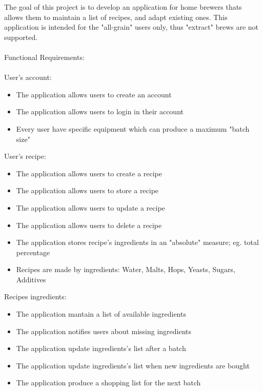 \documentclass[12pt]{article}
\begin{document}
The goal of this project is to develop an application for home brewers thats allows them to maintain a list of recipes, and adapt existing ones.
This application is intended for the "all-grain" users only, thus "extract" brews are not supported. \\
\\
Functional Requirements:\\
\\
User's account:
\begin{itemize}
\item The application allows users to create an account

\item The application allows users to login in their account

\item Every user have specific equipment which can produce a maximum "batch size"\\
\end{itemize}
User's recipe:
\begin{itemize}
\item The application allows users to create a recipe

\item The application allows users to store a recipe 

\item The application allows users to update a recipe

\item The application allows users to delete a recipe

\item The application stores recipe's ingredients in an "absolute" measure; eg. total percentage

\item Recipes are made by ingredients: Water, Malts, Hops, Yeasts, Sugars, Additives
\end{itemize}
\newpage
Recipes ingredients:\\
\begin{itemize}
\item The application mantain a list of available ingredients

\item The application notifies users about missing ingredients

\item The application update ingredients's list after a batch

\item The application update ingredients's list when new ingredients are bought

\item The application produce a shopping list for the next batch \\
\end{itemize}
\end{document}
